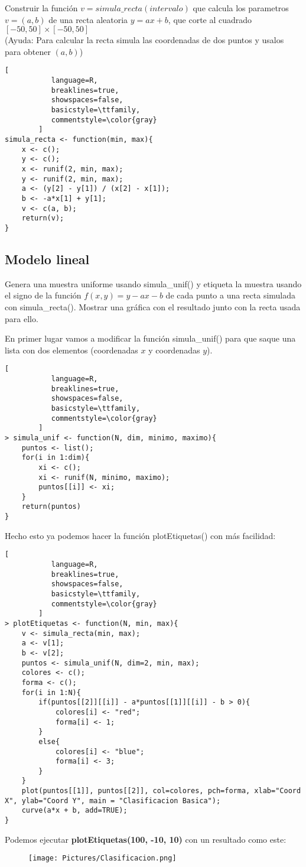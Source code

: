 \documentclass[11pt,fleqn]{book} %
\begin{document}
\begin{exercise}
Construir la función $v = simula\_recta(intervalo)$ que calcula los parametros $ v = (a,b) $ de una recta aleatoria 
$y = ax + b$, que corte al cuadrado $[-50,50]\times[-50,50]$\\
(Ayuda: Para calcular la recta simula las coordenadas de dos puntos y usalos para obtener $(a,b)$)
\end{exercise}
\begin{lstlisting}[
           language=R,
           breaklines=true,
           showspaces=false,
           basicstyle=\ttfamily,
           commentstyle=\color{gray}
        ]
simula_recta <- function(min, max){
    x <- c();
    y <- c();
    x <- runif(2, min, max);
    y <- runif(2, min, max);
    a <- (y[2] - y[1]) / (x[2] - x[1]);
    b <- -a*x[1] + y[1];
    v <- c(a, b);
    return(v);
}
\end{lstlisting}
\subsection{Modelo lineal}
\begin{exercise}
Genera una muestra uniforme usando simula\_unif() y etiqueta la muestra usando el signo de la función $f(x,y) = y - ax - b$
de cada punto a una recta simulada con simula\_recta(). Mostrar una gráfica con el resultado junto con la recta usada para ello.
\end{exercise}
En primer lugar vamos a modificar la función simula\_unif() para que saque una lista con dos elementos (coordenadas $x$ y coordenadas $y$).
\begin{lstlisting}[
           language=R,
           breaklines=true,
           showspaces=false,
           basicstyle=\ttfamily,
           commentstyle=\color{gray}
        ]
> simula_unif <- function(N, dim, minimo, maximo){
    puntos <- list();
    for(i in 1:dim){
        xi <- c();
        xi <- runif(N, minimo, maximo);
        puntos[[i]] <- xi;
    }
    return(puntos)
}
\end{lstlisting}
Hecho esto ya podemos hacer la función plotEtiquetas() con más facilidad:

\begin{lstlisting}[
           language=R,
           breaklines=true,
           showspaces=false,
           basicstyle=\ttfamily,
           commentstyle=\color{gray}
        ]
> plotEtiquetas <- function(N, min, max){
    v <- simula_recta(min, max);
    a <- v[1];
    b <- v[2];
    puntos <- simula_unif(N, dim=2, min, max);
    colores <- c();
    forma <- c();
    for(i in 1:N){
        if(puntos[[2]][[i]] - a*puntos[[1]][[i]] - b > 0){
            colores[i] <- "red";
            forma[i] <- 1;
        }
        else{
            colores[i] <- "blue";
            forma[i] <- 3;
        }
    }
    plot(puntos[[1]], puntos[[2]], col=colores, pch=forma, xlab="Coord X", ylab="Coord Y", main = "Clasificacion Basica");
    curve(a*x + b, add=TRUE);
}
\end{lstlisting}
Podemos ejecutar \textbf{plotEtiquetas(100, -10, 10)} con un resultado como este:
\begin{figure}[h]
\texttt{[image: Pictures/Clasificacion.png]}
\end{figure}
\end{document}
